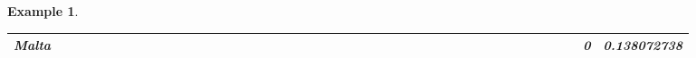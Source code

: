 \documentclass[a4paper,11pt]{report}
\newtheorem{example}[theorem]{Example}
\begin{document}
\begin{example}
\begin{appendices}
\begin{landscape}
\begin{longtable}{r|r|r|r|r|r|r|r|r|r|r|r|r|r|r|r|r|r|r|r|r|r|r|r|r|r|r|r|r|r|r|r|r|r|r|r|r|r|r|r|r|r|r|r|}
\multicolumn{1}{|r|}{\textbf{Malta}}                 &                                       &                                       &                                          &                                       &                                       &                                                     &                                        &                                       &                                      &                                       &                                       &                                                &                                       &                                      &                                       &                                       &                                      &                                       &                                       &                                      &                                      &                                         &                                     &                                       &                                      &                                      &                                        &                                       &                                      &                                      &                                        &                                        &                                     &                                      &                                           &                                               &                                      &                                       &                                              &                                      &                                     & 0                                             & 0.138072738                             \\ \hline

\end{longtable}
\end{landscape}
\end{appendices}
\end{example}
\end{document}
